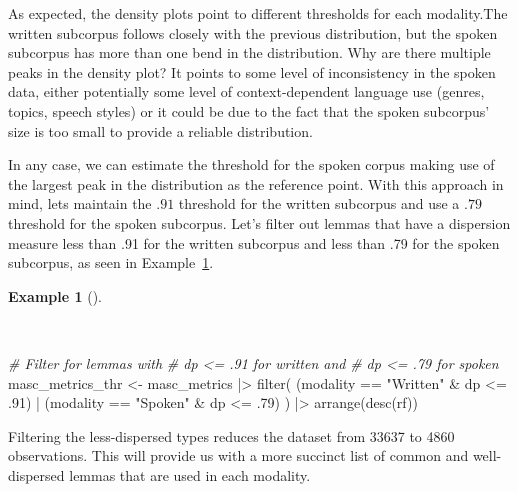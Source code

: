 \documentclass[
  letterpaper,
  DIV=11,
  numbers=noendperiod]{scrreport}
\newenvironment{Shaded}{\begin{snugshade}}{\end{snugshade}}
\newcommand{\CommentTok}[1]{\textcolor[rgb]{0.00,0.00,0.00}{\textit{#1}}}
\newcommand{\DecValTok}[1]{\textcolor[rgb]{0.00,0.00,0.00}{#1}}
\newcommand{\FunctionTok}[1]{\textcolor[rgb]{0.00,0.00,0.00}{#1}}
\newcommand{\NormalTok}[1]{\textcolor[rgb]{0.00,0.00,0.00}{#1}}
\newcommand{\OtherTok}[1]{\textcolor[rgb]{0.00,0.00,0.00}{#1}}
\newcommand{\SpecialCharTok}[1]{\textcolor[rgb]{0.00,0.00,0.00}{#1}}
\newcommand{\StringTok}[1]{\textcolor[rgb]{0.00,0.00,0.00}{#1}}
\theoremstyle{definition}
\newtheorem{example}{Example}[chapter]
\theoremstyle{remark}
\begin{document}
As expected, the density plots point to different thresholds for each
modality.The written subcorpus follows closely with the previous
distribution, but the spoken subcorpus has more than one bend in the
distribution. Why are there multiple peaks in the density plot? It
points to some level of inconsistency in the spoken data, either
potentially some level of context-dependent language use (genres,
topics, speech styles) or it could be due to the fact that the spoken
subcorpus' size is too small to provide a reliable distribution.

In any case, we can estimate the threshold for the spoken corpus making
use of the largest peak in the distribution as the reference point. With
this approach in mind, lets maintain the \(.91\) threshold for the
written subcorpus and use a \(.79\) threshold for the spoken subcorpus.
Let's filter out lemmas that have a dispersion measure less than .91 for
the written subcorpus and less than .79 for the spoken subcorpus, as
seen in Example~\ref{exm-eda-masc-subcorpora-filtered}.

\begin{example}[]\protect\hypertarget{exm-eda-masc-subcorpora-filtered}{}\label{exm-eda-masc-subcorpora-filtered}

~

\begin{Shaded}
\begin{Highlighting}[]
\CommentTok{\# Filter for lemmas with}
\CommentTok{\# dp \textless{}= .91 for written and }
\CommentTok{\# dp \textless{}= .79 for spoken}
\NormalTok{masc\_metrics\_thr }\OtherTok{\textless{}{-}} 
\NormalTok{  masc\_metrics }\SpecialCharTok{|\textgreater{}} 
  \FunctionTok{filter}\NormalTok{(}
\NormalTok{    (modality }\SpecialCharTok{==} \StringTok{"Written"} \SpecialCharTok{\&}\NormalTok{ dp }\SpecialCharTok{\textless{}=}\NormalTok{ .}\DecValTok{91}\NormalTok{) }\SpecialCharTok{|} 
\NormalTok{    (modality }\SpecialCharTok{==} \StringTok{"Spoken"} \SpecialCharTok{\&}\NormalTok{ dp }\SpecialCharTok{\textless{}=}\NormalTok{ .}\DecValTok{79}\NormalTok{)}
\NormalTok{  ) }\SpecialCharTok{|\textgreater{}} 
  \FunctionTok{arrange}\NormalTok{(}\FunctionTok{desc}\NormalTok{(rf))}
\end{Highlighting}
\end{Shaded}

\end{example}

Filtering the less-dispersed types reduces the dataset from 33637 to
4860 observations. This will provide us with a more succinct list of
common and well-dispersed lemmas that are used in each modality.
\end{document}

